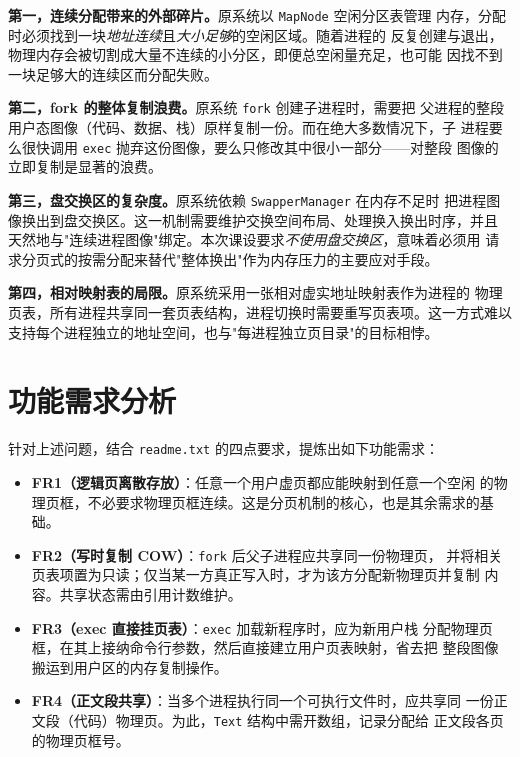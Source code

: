 \textbf{第一，连续分配带来的外部碎片。}原系统以 \texttt{MapNode} 空闲分区表管理
内存，分配时必须找到一块\emph{地址连续}且\emph{大小足够}的空闲区域。随着进程的
反复创建与退出，物理内存会被切割成大量不连续的小分区，即便总空闲量充足，也可能
因找不到一块足够大的连续区而分配失败。

\textbf{第二，fork 的整体复制浪费。}原系统 \texttt{fork} 创建子进程时，需要把
父进程的整段用户态图像（代码、数据、栈）原样复制一份。而在绝大多数情况下，子
进程要么很快调用 \texttt{exec} 抛弃这份图像，要么只修改其中很小一部分——对整段
图像的立即复制是显著的浪费。

\textbf{第三，盘交换区的复杂度。}原系统依赖 \texttt{SwapperManager} 在内存不足时
把进程图像换出到盘交换区。这一机制需要维护交换空间布局、处理换入换出时序，并且
天然地与"连续进程图像"绑定。本次课设要求\emph{不使用盘交换区}，意味着必须用
请求分页式的按需分配来替代"整体换出"作为内存压力的主要应对手段。

\textbf{第四，相对映射表的局限。}原系统采用一张相对虚实地址映射表作为进程的
物理页表，所有进程共享同一套页表结构，进程切换时需要重写页表项。这一方式难以
支持每个进程独立的地址空间，也与"每进程独立页目录"的目标相悖。

\section{功能需求分析}
针对上述问题，结合 \texttt{readme.txt} 的四点要求，提炼出如下功能需求：

\begin{itemize}[label=\textbf{FR\arabic*}]
  \item \textbf{FR1（逻辑页离散存放）}：任意一个用户虚页都应能映射到任意一个空闲
        的物理页框，不必要求物理页框连续。这是分页机制的核心，也是其余需求的基础。
  \item \textbf{FR2（写时复制 COW）}：\texttt{fork} 后父子进程应共享同一份物理页，
        并将相关页表项置为只读；仅当某一方真正写入时，才为该方分配新物理页并复制
        内容。共享状态需由引用计数维护。
  \item \textbf{FR3（exec 直接挂页表）}：\texttt{exec} 加载新程序时，应为新用户栈
        分配物理页框，在其上接纳命令行参数，然后直接建立用户页表映射，省去把
        整段图像搬运到用户区的内存复制操作。
  \item \textbf{FR4（正文段共享）}：当多个进程执行同一个可执行文件时，应共享同
        一份正文段（代码）物理页。为此，\texttt{Text} 结构中需开数组，记录分配给
        正文段各页的物理页框号。
\end{itemize}

